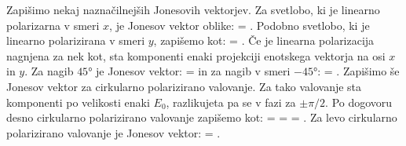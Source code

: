 Zapišimo nekaj naznačilnejših Jonesovih vektorjev. Za svetlobo, ki 
je linearno polarizarna v smeri $x$, je Jonesov vektor oblike:
\beq
{} = \left[\begin{array}{c}
1\\
0\\
\end{array}\right]\!\!.
\label{eq:03_42}
\eeq
Podobno svetlobo, ki je linearno polarizirana v smeri $y$, zapišemo kot:
\beq
{} = \left[\begin{array}{c}
0\\
1\\
\end{array}\right]\!\!.
\label{eq:03_43}
\eeq
Če je linearna polarizacija nagnjena za nek kot, sta komponenti enaki projekciji
enotskega vektorja na osi $x$ in $y$. Za nagib $45\si{\degree}$ je
Jonesov vektor:
\beq
{} = \left[\begin{array}{c}
1\\
1\\
\end{array}\right]
\label{eq:03_44}
\eeq
in za nagib v smeri $-45\si{\degree}$:
\beq
{} = \left[\begin{array}{c}
1\\
-1\\
\end{array}\right]\!\!.
\label{eq:03_45}
\eeq
Zapišimo še Jonesov vektor za cirkularno polarizirano
valovanje. Za tako valovanje sta komponenti po velikosti enaki $E_0$, 
razlikujeta pa se v fazi za $\pm \pi/2$. 
Po dogovoru desno cirkularno polarizirano valovanje zapišemo kot:
\beq
{} = 
 = 
\left[\begin{array}{c}
1\\
e^{-i \pi/2}\\
\end{array}\right] =
\left[\begin{array}{c}
1\\
-i\\
\end{array}\right]\!\!.
\label{eq:03_46}
\eeq
Za levo cirkularno polarizirano valovanje je Jonesov
vektor:
\beq
{} = 
\left[\begin{array}{c}
1\\
i\\
\end{array}\right]\!\!.
\label{eq:03_47}
\eeq

